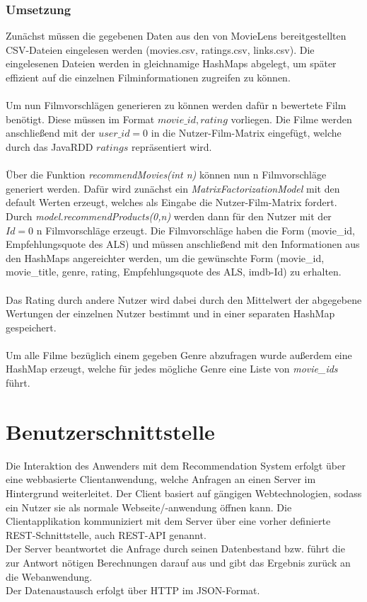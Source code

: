 \subsection{Umsetzung}
Zunächst müssen die gegebenen Daten aus den von MovieLens\citep{lit:INET4} bereitgestellten CSV-Dateien eingelesen werden (movies.csv, ratings.csv, links.csv). Die eingelesenen Dateien werden in gleichnamige HashMaps abgelegt, um später effizient auf die einzelnen Filminformationen zugreifen zu können. \\\\ Um nun Filmvorschlägen generieren zu können werden dafür n bewertete Film benötigt. Diese müssen im Format $movie\_id,rating$ vorliegen. Die Filme werden anschließend mit der $user\_id=0$ in die Nutzer-Film-Matrix eingefügt, welche durch das JavaRDD $ratings$ repräsentiert wird.\\\\
Über die Funktion \textit{recommendMovies(int n)} können nun n Filmvorschläge generiert werden. Dafür wird zunächst ein \textit{MatrixFactorizationModel} mit den default Werten erzeugt, welches als Eingabe die Nutzer-Film-Matrix fordert.\\ Durch \textit{model.recommendProducts(0,n)} werden dann für den Nutzer mit der $Id=0$ n Filmvorschläge erzeugt. Die Filmvorschläge haben die Form (movie\_id, Empfehlungsquote des ALS) und müssen anschließend mit den Informationen aus den HashMaps angereichter werden, um die gewünschte Form (movie\_id, movie\_title, genre, rating, Empfehlungsquote des ALS, imdb-Id) zu erhalten.\\\\
Das Rating durch andere Nutzer wird dabei durch den Mittelwert der abgegebene Wertungen der einzelnen Nutzer bestimmt und in einer separaten HashMap gespeichert.\\\\
Um alle Filme bezüglich einem gegeben Genre abzufragen wurde außerdem eine HashMap erzeugt, welche für jedes mögliche Genre eine Liste von \textit{movie\_ids} führt.


\chapter{Benutzerschnittstelle}
Die Interaktion des Anwenders mit dem Recommendation System erfolgt über eine webbasierte Clientanwendung, welche Anfragen an einen Server im Hintergrund weiterleitet. Der Client basiert auf gängigen Webtechnologien, sodass ein Nutzer sie als normale Webseite/-anwendung öffnen kann. Die Clientapplikation kommuniziert mit dem Server über eine vorher definierte REST-Schnittstelle, auch REST-API genannt.\\
Der Server beantwortet die Anfrage durch seinen Datenbestand bzw. führt die zur Antwort nötigen Berechnungen darauf aus und gibt das Ergebnis zurück an die Webanwendung.\\
Der Datenaustausch erfolgt über HTTP im JSON-Format.

